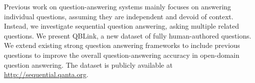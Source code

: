 Previous work on question-answering systems mainly focuses on answering individual questions, assuming they are independent and devoid of context. Instead, we investigate sequential question answering, asking multiple related questions. We present QBLink, a new dataset of fully human-authored questions. We extend existing strong question answering frameworks to include previous questions to improve the overall question-answering accuracy in open-domain question answering. The dataset is publicly available at \url{http://sequential.qanta.org}.
